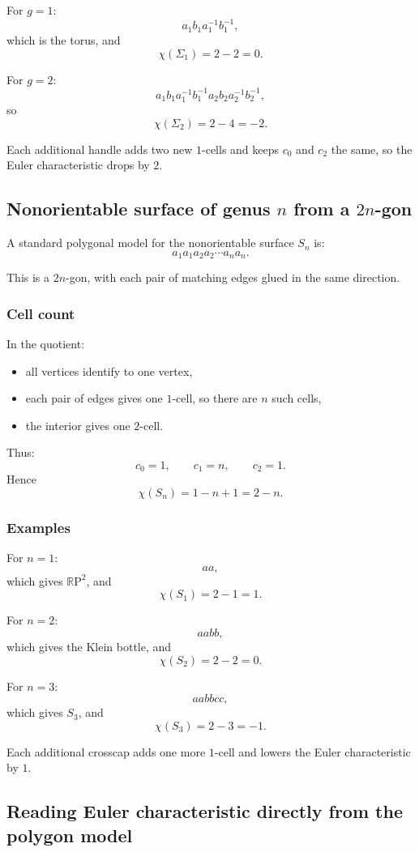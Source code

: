 \documentclass[12pt,a4paper]{article}
\newcommand{\RP}{\mathbb{R}\mathrm{P}}
\theoremstyle{notespace}
\begin{document}
For \(g=1\):
\[
a_1b_1a_1^{-1}b_1^{-1},
\]
which is the torus, and
\[
\chi(\Sigma_1)=2-2=0.
\]

For \(g=2\):
\[
a_1b_1a_1^{-1}b_1^{-1}a_2b_2a_2^{-1}b_2^{-1},
\]
so
\[
\chi(\Sigma_2)=2-4=-2.
\]

Each additional handle adds two new \(1\)-cells and keeps \(c_0\) and \(c_2\) the same, so the Euler characteristic drops by \(2\).

\subsection{Nonorientable surface of genus \(n\) from a \(2n\)-gon}

A standard polygonal model for the nonorientable surface \(S_n\) is:
\[
a_1a_1a_2a_2\cdots a_n a_n.
\]

This is a \(2n\)-gon, with each pair of matching edges glued in the same direction.

\subsubsection*{Cell count}

In the quotient:
\begin{itemize}
	\item all vertices identify to one vertex,
	\item each pair of edges gives one \(1\)-cell, so there are \(n\) such cells,
	\item the interior gives one \(2\)-cell.
\end{itemize}

Thus:
\[
c_0=1,\qquad c_1=n,\qquad c_2=1.
\]
Hence
\[
\chi(S_n)=1-n+1=2-n.
\]

\subsubsection*{Examples}

For \(n=1\):
\[
aa,
\]
which gives \(\RP^2\), and
\[
\chi(S_1)=2-1=1.
\]

For \(n=2\):
\[
aabb,
\]
which gives the Klein bottle, and
\[
\chi(S_2)=2-2=0.
\]

For \(n=3\):
\[
aabbcc,
\]
which gives \(S_3\), and
\[
\chi(S_3)=2-3=-1.
\]

Each additional crosscap adds one more \(1\)-cell and lowers the Euler characteristic by \(1\).

\subsection{Reading Euler characteristic directly from the polygon model}
\end{document}
